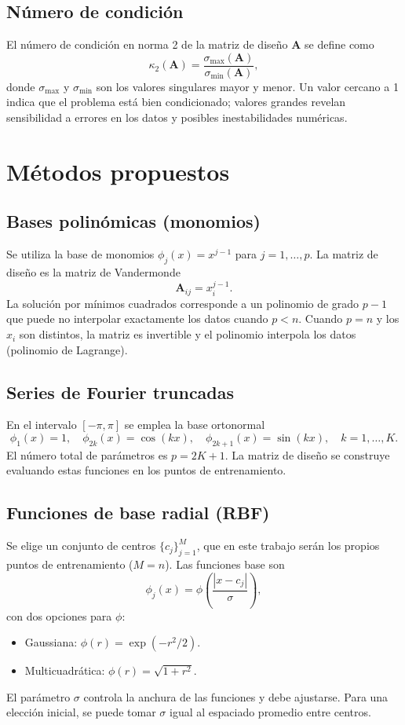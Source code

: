 \subsection{Número de condición}
El número de condición en norma 2 de la matriz de diseño \(\mathbf{A}\) se define como
\[
\kappa_2(\mathbf{A}) = \frac{\sigma_{\max}(\mathbf{A})}{\sigma_{\min}(\mathbf{A})},
\]
donde \(\sigma_{\max}\) y \(\sigma_{\min}\) son los valores singulares mayor y menor. Un valor cercano a 1 indica que el problema está bien condicionado; valores grandes revelan sensibilidad a errores en los datos y posibles inestabilidades numéricas.

\section{Métodos propuestos}

\subsection{Bases polinómicas (monomios)}
Se utiliza la base de monomios \(\phi_j(x) = x^{j-1}\) para \(j=1,\dots,p\). La matriz de diseño es la matriz de Vandermonde
\[
\mathbf{A}_{ij} = x_i^{j-1}.
\]
La solución por mínimos cuadrados corresponde a un polinomio de grado \(p-1\) que puede no interpolar exactamente los datos cuando \(p < n\). Cuando \(p = n\) y los \(x_i\) son distintos, la matriz es invertible y el polinomio interpola los datos (polinomio de Lagrange).

\subsection{Series de Fourier truncadas}
En el intervalo \([-\pi,\pi]\) se emplea la base ortonormal
\[
\phi_1(x)=1,\quad \phi_{2k}(x)=\cos(kx),\quad \phi_{2k+1}(x)=\sin(kx),\quad k=1,\dots,K.
\]
El número total de parámetros es \(p = 2K+1\). La matriz de diseño se construye evaluando estas funciones en los puntos de entrenamiento.

\subsection{Funciones de base radial (RBF)}
Se elige un conjunto de centros \(\{c_j\}_{j=1}^{M}\), que en este trabajo serán los propios puntos de entrenamiento (\(M = n\)). Las funciones base son
\[
\phi_j(x) = \phi\!\left(\frac{|x-c_j|}{\sigma}\right),
\]
con dos opciones para \(\phi\):
\begin{itemize}
  \item Gaussiana: \(\phi(r) = \exp(-r^2/2)\).
  \item Multicuadrática: \(\phi(r) = \sqrt{1 + r^2}\).
\end{itemize}
El parámetro \(\sigma\) controla la anchura de las funciones y debe ajustarse. Para una elección inicial, se puede tomar \(\sigma\) igual al espaciado promedio entre centros.

